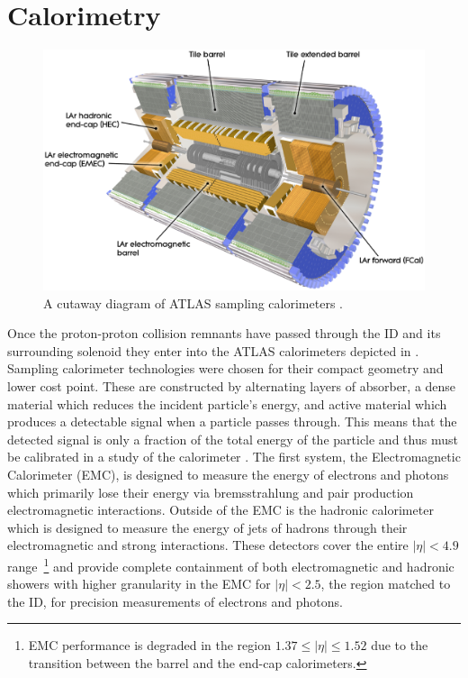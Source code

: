 \section{Calorimetry} \label{sec:atlas:calorimetry}

\begin{figure}[!htbp]
  \begin{center}
    \includegraphics[width=0.8\linewidth]{figures/atlas/calorimeter_cutaway}
    \caption{A cutaway diagram of ATLAS sampling calorimeters \cite{PERF-2007-01}.}
    \label{fig:calorimeter_cutaway}
  \end{center}
\end{figure}

Once the proton-proton collision remnants have passed through the ID and its
surrounding solenoid they enter into the ATLAS calorimeters depicted in
.  Sampling calorimeter technologies were chosen
for their compact geometry and lower cost point.  These are constructed by
alternating layers of absorber, a dense material which reduces the incident
particle's energy, and active material which produces a detectable signal when a
particle passes through.  This means that the detected signal is only a
fraction of the total energy of the particle and thus must be calibrated in a
study of the calorimeter \cite{Fabjan:692252}. The first system, the
Electromagnetic Calorimeter (EMC), is designed to measure the energy of
electrons and photons which primarily lose their energy via bremsstrahlung and
pair production electromagnetic interactions.  Outside of the EMC is the
hadronic calorimeter which is designed to measure the energy of jets of hadrons
through their electromagnetic and strong interactions. These detectors cover
the entire $|\eta| < 4.9$ range~\footnote{EMC performance is degraded in the
region $1.37 \leq |\eta| \leq 1.52$ due to the transition between the barrel
and the end-cap calorimeters.} and provide complete containment of both
electromagnetic and hadronic showers with higher granularity in the EMC for
$|\eta| < 2.5$, the region matched to the ID, for precision measurements of
electrons and photons.

